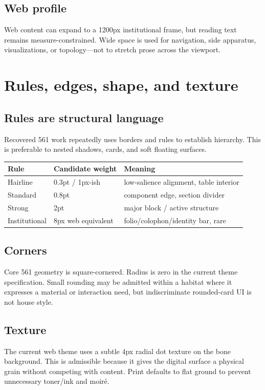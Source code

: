 \documentclass[11pt,twoside,openany]{report}
\begin{document}
\section{Web profile}
Web content can expand to a 1200px institutional frame, but reading text remains measure-constrained. Wide space is used for navigation, side apparatus, visualizations, or topology---not to stretch prose across the viewport.

\clearpage
\chapter{Rules, edges, shape, and texture}

\section{Rules are structural language}
Recovered 561 work repeatedly uses borders and rules to establish hierarchy. This is preferable to nested shadows, cards, and soft floating surfaces.

\begin{tabularx}{\textwidth}{@{}L{30mm}L{28mm}Y@{}}
\toprule
Rule & Candidate weight & Meaning\\
\midrule
Hairline & 0.3pt / 1px-ish & low-salience alignment, table interior\\
Standard & 0.8pt & component edge, section divider\\
Strong & 2pt & major block / active structure\\
Institutional & 8px web equivalent & folio/colophon/identity bar, rare\\
\bottomrule
\end{tabularx}

\section{Corners}
Core 561 geometry is square-cornered. Radius is zero in the current theme specification. Small rounding may be admitted within a habitat where it expresses a material or interaction need, but indiscriminate rounded-card UI is not house style.

\section{Texture}
The current web theme uses a subtle 4px radial dot texture on the bone background. This is admissible because it gives the digital surface a physical grain without competing with content. Print defaults to flat ground to prevent unnecessary toner/ink and moiré.
\end{document}
